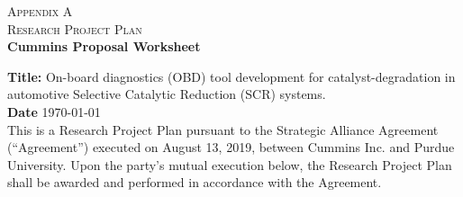 \begin{center}
    \textsc{Appendix A}\\
    \bigskip
    \textsc{Research Project Plan}\\
    \textbf{Cummins Proposal Worksheet}
\end{center}
\tableofcontents

\bigskip

\textbf{Title:} On-board diagnostics (OBD) tool development for
catalyst-degradation in automotive Selective Catalytic Reduction (SCR)
systems.\\

\textbf{Date} \today\\

This is a Research Project Plan pursuant to the Strategic Alliance Agreement
(“Agreement”) executed on August 13, 2019,  between Cummins Inc. and Purdue
University.  Upon the party's mutual execution below, the Research Project Plan
shall be awarded and performed in accordance with the Agreement.


\newpage

\newpage







\newpage


